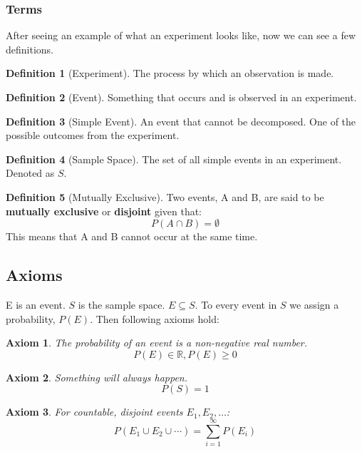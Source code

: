 \documentclass{article}
\theoremstyle{plain}
\newtheorem{axiom}{Axiom}
\theoremstyle{definition}
\newtheorem{defn}{Definition}[section]
\theoremstyle{remark}
\begin{document}
\subsubsection{Terms}
After seeing an example of what an experiment looks like, now we can see a few definitions.
\begin{defn}[Experiment]
The process by which an observation is made.
\end{defn}

\begin{defn}[Event]
  Something that occurs and is observed in an experiment.
\end{defn}

\begin{defn}[Simple Event]
  An event that cannot be decomposed. One of the possible outcomes from the experiment. 
\end{defn}

\begin{defn}[Sample Space]
The set of all simple events in an experiment. Denoted as $S$.
\end{defn}

\begin{defn}[Mutually Exclusive] 
Two events, A and B, are said to be \textbf{mutually exclusive} or \textbf{disjoint} given that:
$$
P(A \cap B) = \emptyset
$$
This means that A and B cannot occur at the same time.
\end{defn}


\subsection{Axioms}
E is an event. $S$ is the sample space. $E \subseteq S$. To every event in $S$ we assign a probability, $P(E)$. Then following axioms hold:
\begin{axiom} 
The probability of an event is a non-negative real number.
$$
P(E) \in \mathbb{R}, P(E) \geq 0
$$
\end{axiom}

\begin{axiom} 
Something will always happen.
$$
P(S) = 1
$$
\end{axiom}

\begin{axiom} 
For countable, disjoint events $E_1,E_2,\ldots$:
$$ 
P(E_1 \cup E_2 \cup \cdots) = \displaystyle \sum_{i=1}^{\infty} P(E_i)
$$
\end{axiom}
\end{document}
